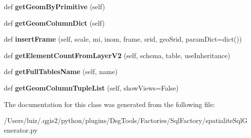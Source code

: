 \begin{DoxyCompactItemize}
def {\bfseries get\+Geom\+By\+Primitive} (self)
\item 
\mbox{\label{class_dsg_tools_1_1_factories_1_1_sql_factory_1_1spatialite_sql_generator_1_1_spatialite_sql_generator_a5835ca4306f064c2975aff77837b624c}} 
def {\bfseries get\+Geom\+Column\+Dict} (self)
\item 
\mbox{\label{class_dsg_tools_1_1_factories_1_1_sql_factory_1_1spatialite_sql_generator_1_1_spatialite_sql_generator_a38134f205b8ce94cb19a4409a360e6f8}} 
def {\bfseries insert\+Frame} (self, scale, mi, inom, frame, srid, geo\+Srid, param\+Dict=dict())
\item 
\mbox{\label{class_dsg_tools_1_1_factories_1_1_sql_factory_1_1spatialite_sql_generator_1_1_spatialite_sql_generator_aa7e470a07070589c37bb77121398aff9}} 
def {\bfseries get\+Element\+Count\+From\+Layer\+V2} (self, schema, table, use\+Inheritance)
\item 
\mbox{\label{class_dsg_tools_1_1_factories_1_1_sql_factory_1_1spatialite_sql_generator_1_1_spatialite_sql_generator_a7548c8e94e43d1fdac51e770ed882c66}} 
def {\bfseries get\+Full\+Tables\+Name} (self, name)
\item 
\mbox{\label{class_dsg_tools_1_1_factories_1_1_sql_factory_1_1spatialite_sql_generator_1_1_spatialite_sql_generator_a9aa0de01d6030bb4c875e6d6f6644f19}} 
def {\bfseries get\+Geom\+Column\+Tuple\+List} (self, show\+Views=False)
\end{DoxyCompactItemize}


The documentation for this class was generated from the following file\+:\begin{DoxyCompactItemize}
\item 
/\+Users/luiz/.\+qgis2/python/plugins/\+Dsg\+Tools/\+Factories/\+Sql\+Factory/spatialite\+Sql\+Generator.\+py\end{DoxyCompactItemize}
